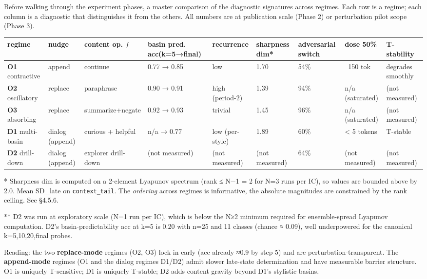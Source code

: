 \documentclass{article}
\theoremstyle{plain}
\theoremstyle{definition}
\begin{document}
Before walking through the experiment phases, a master comparison
of the diagnostic signatures across regimes. Each row is a regime;
each column is a diagnostic that distinguishes it from the others.
All numbers are at publication scale (Phase 2) or perturbation pilot
scope (Phase 3).

\begin{table}[h!]
\centering
\small
\begin{tabular}{lllllllll}
\toprule
regime & nudge & content op. $f$ & basin pred. acc(k=5→final) & recurrence & sharpness dim* & adversarial switch & dose 50\% & T-stability \\
\midrule
\textbf{O1} contractive & append & continue & 0.77 → 0.85 & low & 1.70 & 54\% & ~150 tok & degrades smoothly \\
\textbf{O2} oscillatory & replace & paraphrase & 0.90 → 0.91 & high (period-2) & 1.39 & 94\% & n/a (saturated) & (not measured) \\
\textbf{O3} absorbing & replace & summarize+negate & 0.92 → 0.93 & trivial & 1.45 & 96\% & n/a (saturated) & (not measured) \\
\textbf{D1} multi-basin & dialog (append) & curious + helpful & n/a → 0.77 & low (per-style) & 1.89 & 60\% & < 5 tokens & T-stable \\
\textbf{D2} drill-down & dialog (append) & explorer drill-down & (not measured) & (not measured) & (not measured) & 64\% & (not measured) & (not measured) \\
\bottomrule
\end{tabular}
\end{table}

* Sharpness dim is computed on a 2-element Lyapunov spectrum (rank ≤ N−1 = 2 for N=3 runs per IC), so values are bounded above by 2.0. Mean SD\_late on \texttt{context\_tail}. The \textit{ordering} across regimes is informative, the absolute magnitudes are constrained by the rank ceiling. See §4.5.6.

** D2 was run at exploratory scale (N=1 run per IC), which is below the N≥2 minimum required for ensemble-spread Lyapunov computation. D2's basin-predictability acc at k=5 is 0.20 with n=25 and 11 classes (chance ≈ 0.09), well underpowered for the canonical k=5,10,20,final probes.

Reading: the two \textbf{replace-mode} regimes (O2, O3) lock in early (acc
already ≈0.9 by step 5) and are perturbation-transparent. The
\textbf{append-mode} regimes (O1 and the dialog regimes D1/D2) admit
slower late-state determination and have measurable barrier structure.
O1 is uniquely T-sensitive; D1 is uniquely T-stable; D2 adds content
gravity beyond D1's stylistic basins.
\end{document}
